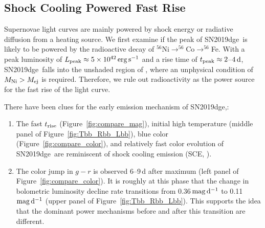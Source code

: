 \documentclass[twocolumn]{aastex63}
\newcommand{\name}{SN2019dge}
\begin{document}
\subsection{Shock Cooling Powered Fast Rise} \label{subsec:fastrise}
Supernovae light curves are mainly powered by shock energy or radiative diffusion from a heating 
source. We first examine if the peak of \name\ is likely to be powered by the radioactive decay of 
$^{56}$Ni$\rightarrow ^{56}$Co$\rightarrow ^{56}$Fe. With a peak luminosity of $L_{\rm 
peak}\approx 5\times 10^{42}\,{\rm erg \, s^{-1}}$ and a rise time of  $t_{\rm peak}\approx 2$--$4\,{\rm 
d}$, \name\ falls into the unshaded region of \citet[][their Figure~1]{Kasen2017}, where an unphysical 
condition of $M_{\rm Ni} > M_{\rm ej}$ is required. Therefore, we rule out radioactivity as the 
power source for the fast rise of the light curve.

There have been clues for the early emission mechanism of \name,:
\begin{enumerate}[label=(\roman*)]
	\item The fast $t_{\rm rise}$ (Figure~\ref{fig:compare_mag}), {\color{red} initial high} temperature 
	(middle panel of Figure~\ref{fig:Tbb_Rbb_Lbb}), blue color (Figure~\ref{fig:compare_color}), and 
	relatively fast color evolution of \name\ are reminiscent of shock cooling emission (SCE, 
	\citealt{Nakar2014, 
	Piro2015, Piro2020}).
	\item The color jump in $g-r$ is observed 6--9\,d after maximum (left panel of 
	Figure~\ref{fig:compare_color}). It is roughly at this phase that the change in bolometric luminosity 
	decline rate transitions from 0.36\,$\rm mag\, d^{-1}$ to 0.11 $\rm mag\, d^{-1}$
	(upper panel of Figure~\ref{fig:Tbb_Rbb_Lbb}). This supports the idea that the dominant power 
	mechanisms before and after this transition are different.
\end{enumerate}
\end{document}
